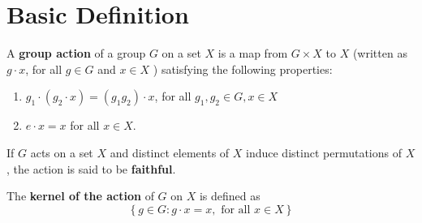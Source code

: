 \section{Basic Definition}

\begin{definition}
    A \textbf{group action} of a group $G$ on a set $X$ is a map from $G \times X$ to $X$ (written as $g \cdot x$, for all $g \in G$ and $x \in X$ ) satisfying the following properties:
    \begin{enumerate}[label=(\roman*)]
        \item $g_1 \cdot\left(g_2 \cdot x\right)=\left(g_1 g_2\right) \cdot x$, for all $g_1, g_2 \in G, x \in X$

        \item  $e \cdot x=x$ for all $x \in X$.
    \end{enumerate}
    If $G$ acts on a set $X$ and distinct elements of $X$ induce distinct permutations of $X$, the action is said to be \textbf{faithful}.

    The \textbf{kernel of the action} of $G$ on $X$ is defined as
    \begin{equation*}
        \left\{g \in G : g \cdot x=x, \text { for all } x \in X\right\}
    \end{equation*}
\end{definition}

